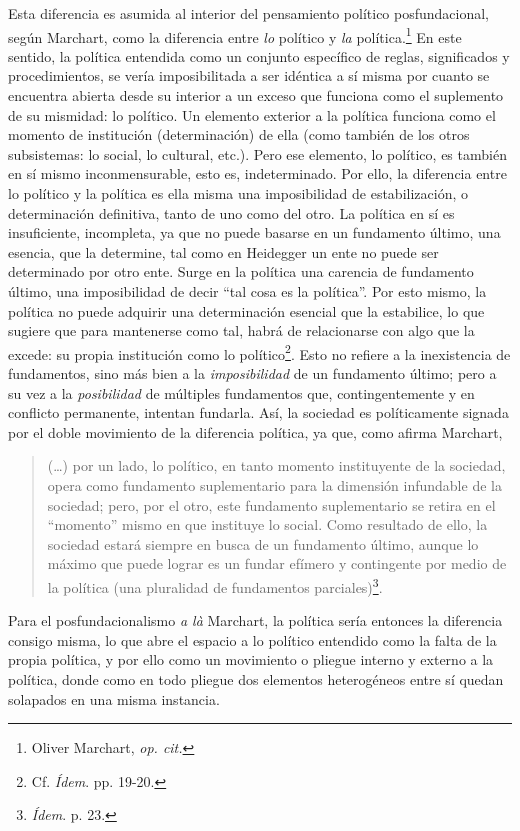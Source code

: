 Esta diferencia es asumida al interior del pensamiento político posfundacional, según Marchart, como la diferencia entre \emph{lo} político y \emph{la} política.\footnote{Oliver Marchart, \emph{op. cit.}} En este sentido, la política entendida como un conjunto específico de reglas, significados y procedimientos, se vería imposibilitada a ser idéntica a sí misma por cuanto se encuentra abierta desde su interior a un exceso que funciona como el suplemento de su mismidad: lo político. Un elemento exterior a la política funciona como el momento de institución (determinación) de ella (como también de los otros subsistemas: lo social, lo cultural, etc.). Pero ese elemento, lo político, es también en sí mismo inconmensurable, esto es, indeterminado. Por ello, la diferencia entre lo político y la política es ella misma una imposibilidad de estabilización, o determinación definitiva, tanto de uno como del otro. La política en sí es insuficiente, incompleta, ya que no puede basarse en un fundamento último, una esencia, que la determine, tal como en Heidegger un ente no puede ser determinado por otro ente. Surge en la política una carencia de fundamento último, una imposibilidad de decir \enquote{tal cosa es la política}. Por esto mismo, la política no puede adquirir una determinación esencial que la estabilice, lo que sugiere que para mantenerse como tal, habrá de relacionarse con algo que la excede: su propia institución como lo político\footnote{Cf. \emph{Ídem}. pp. 19-20.}. Esto no refiere a la inexistencia de fundamentos, sino más bien a la \emph{imposibilidad} de un fundamento último; pero a su vez a la \emph{posibilidad} de múltiples fundamentos que, contingentemente y en conflicto permanente, intentan fundarla. Así, la sociedad es políticamente signada por el doble movimiento de la diferencia política, ya que, como afirma Marchart,

\begin{quote}
(\dots) por un lado, lo político, en tanto momento instituyente de la sociedad, opera como fundamento suplementario para la dimensión infundable de la sociedad; pero, por el otro, este fundamento suplementario se retira en el \enquote{momento} mismo en que instituye lo social. Como resultado de ello, la sociedad estará siempre en busca de un fundamento último, aunque lo máximo que puede lograr es un fundar efímero y contingente por medio de la política (una pluralidad de fundamentos parciales)\footnote{\emph{Ídem}. p. 23.}.
\end{quote}

Para el posfundacionalismo \emph{a là} Marchart, la política sería entonces la diferencia consigo misma, lo que abre el espacio a lo político entendido como la falta de la propia política, y por ello como un movimiento o pliegue interno y externo a la política, donde como en todo pliegue dos elementos heterogéneos entre sí quedan solapados en una misma instancia.

